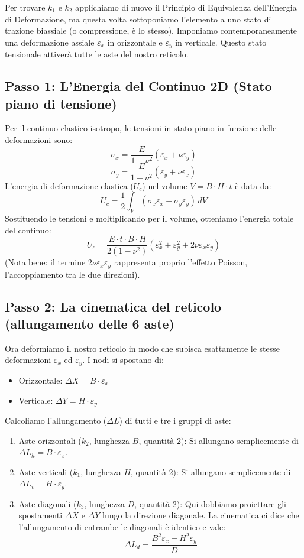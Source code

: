 \documentclass[a4paper]{article}
\begin{document}
\dotfill

Per trovare $k_1$ e $k_2$ applichiamo di nuovo il Principio di Equivalenza dell'Energia di Deformazione, ma questa volta sottoponiamo l'elemento a uno stato di trazione biassiale (o compressione, è lo stesso).
Imponiamo contemporaneamente una deformazione assiale $\varepsilon_x$ in orizzontale e $\varepsilon_y$ in verticale. Questo stato tensionale attiverà tutte le aste del nostro reticolo.
\subsection{Passo 1: L'Energia del Continuo 2D (Stato piano di tensione)}
Per il continuo elastico isotropo, le tensioni in stato piano in funzione delle deformazioni sono:
$$\sigma_x = \frac{E}{1-\nu^2} (\varepsilon_x + \nu \varepsilon_y)$$
$$\sigma_y = \frac{E}{1-\nu^2} (\varepsilon_y + \nu \varepsilon_x)$$
L'energia di deformazione elastica ($U_c$) nel volume $V = B \cdot H \cdot t$ è data da:
$$U_c = \frac{1}{2} \int_V (\sigma_x \varepsilon_x + \sigma_y \varepsilon_y) \, dV$$
Sostituendo le tensioni e moltiplicando per il volume, otteniamo l'energia totale del continuo:
$$U_c = \frac{E \cdot t \cdot B \cdot H}{2(1-\nu^2)} \left( \varepsilon_x^2 + \varepsilon_y^2 + 2\nu \varepsilon_x \varepsilon_y \right)$$
(Nota bene: il termine $2\nu \varepsilon_x \varepsilon_y$ rappresenta proprio l'effetto Poisson, l'accoppiamento tra le due direzioni).
\subsection{Passo 2: La cinematica del reticolo (allungamento delle 6 aste)}
Ora deformiamo il nostro reticolo in modo che subisca esattamente le stesse deformazioni $\varepsilon_x$ ed $\varepsilon_y$.
I nodi si spostano di:
\begin{itemize}
\item Orizzontale: $\Delta X = B \cdot \varepsilon_x$
\item Verticale: $\Delta Y = H \cdot \varepsilon_y$
\end{itemize}
Calcoliamo l'allungamento ($\Delta L$) di tutti e tre i gruppi di aste:
\begin{enumerate}
\item Aste orizzontali ($k_2$, lunghezza $B$, quantità 2):
Si allungano semplicemente di $\Delta L_h = B \cdot \varepsilon_x$.
\item Aste verticali ($k_1$, lunghezza $H$, quantità 2):
Si allungano semplicemente di $\Delta L_v = H \cdot \varepsilon_y$.
\item Aste diagonali ($k_3$, lunghezza $D$, quantità 2):
Qui dobbiamo proiettare gli spostamenti $\Delta X$ e $\Delta Y$ lungo la direzione diagonale. La cinematica ci dice che l'allungamento di entrambe le diagonali è identico e vale:
$$\Delta L_d = \frac{B^2 \varepsilon_x + H^2 \varepsilon_y}{D}$$
\end{enumerate}
\end{document}
